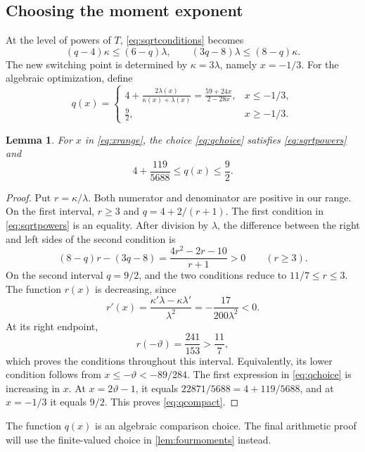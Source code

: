 \documentclass[11pt,reqno]{amsart}
\numberwithin{equation}{section}
\newtheorem{lemma}[lemma]{Lemma}
\theoremstyle{definition}
\theoremstyle{remark}
\newcommand{\vth}{\vartheta}
\begin{document}
\subsection{Choosing the moment exponent}
At the level of powers of $T$, \eqref{eq:sqrtconditions} becomes
\begin{equation}\label{eq:sqrtpowers}
 (q-4)\kappa\le(6-q)\lambda,
 \qquad (3q-8)\lambda\le(8-q)\kappa.
\end{equation}
The new switching point is determined by $\kappa=3\lambda$, namely $x=-1/3$.
For the algebraic optimization, define
\begin{equation}\label{eq:qchoice}
 q(x)=
 \begin{cases}
 \displaystyle 4+\frac{2\lambda(x)}{\kappa(x)+\lambda(x)}
       =\frac{59+24x}{2-28x},&x\le-1/3,\\[6pt]
 \displaystyle\frac92,&x\ge-1/3.
 \end{cases}
\end{equation}

\begin{lemma}\label{lem:qchoice}
For $x$ in \eqref{eq:xrange}, the choice \eqref{eq:qchoice} satisfies \eqref{eq:sqrtpowers} and
\begin{equation}\label{eq:qcompact}
 4+\frac{119}{5688}\le q(x)\le\frac92.
\end{equation}
\end{lemma}
\begin{proof}
Put $r=\kappa/\lambda$. Both numerator and denominator are positive in our range.
On the first interval, $r\ge3$ and $q=4+2/(r+1)$.
The first condition in \eqref{eq:sqrtpowers} is an equality.
After division by $\lambda$, the difference between the right and left sides of the second condition is
\[
 (8-q)r-(3q-8)=\frac{4r^2-2r-10}{r+1}>0\qquad(r\ge3).
\]
On the second interval $q=9/2$, and the two conditions reduce to $11/7\le r\le3$.
The function $r(x)$ is decreasing, since
\[
 r'(x)=\frac{\kappa'\lambda-\kappa\lambda'}{\lambda^2}
       =-\frac{17}{200\lambda^2}<0.
\]
At its right endpoint,
\[
 r(-\vth)=\frac{241}{153}>\frac{11}{7},
\]
which proves the conditions throughout this interval.
Equivalently, its lower condition follows from $x\le-\vth<-89/284$.
The first expression in \eqref{eq:qchoice} is increasing in $x$.
At $x=2\vth-1$, it equals $22871/5688=4+119/5688$, and at $x=-1/3$ it equals $9/2$.
This proves \eqref{eq:qcompact}.
\end{proof}

The function $q(x)$ is an algebraic comparison choice. The final arithmetic proof will use the finite-valued choice in \cref{lem:fourmoments} instead.
\end{document}
